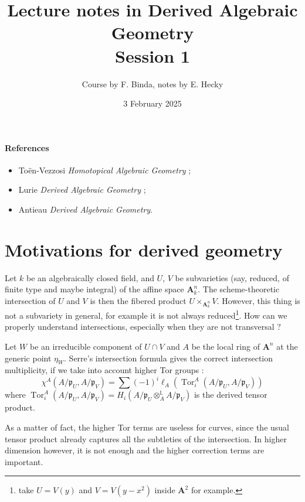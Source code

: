 \documentclass[11pt]{article}
\title{Lecture notes in Derived Algebraic Geometry\\Session 1}
\date{3 February 2025}
\author{Course by F. Binda, notes by E. Hecky}
\theoremstyle{definition}
\newcommand{\A}{\mathbf{A}}
\renewcommand{\L}{\mathbb{L}}
\newcommand{\p}{\mathfrak{p}}
\DeclareMathOperator{\Tor}{Tor}
\begin{document}
\maketitle

\paragraph*{References}
\begin{itemize}
    \item Toën-Vezzosi \emph{Homotopical Algebraic Geometry} ;
    \item Lurie \emph{Derived Algebraic Geometry} ;
    \item Antieau \emph{Derived Algebraic Geometry}.
\end{itemize}

\section*{Motivations for derived geometry}

Let $k$ be an algebraically closed field, and $U$, $V$ be subvarieties (say, reduced, of finite type and maybe integral) of the affine space $\A^n_k$. The scheme-theoretic intersection of $U$ and $V$ is then the fibered product $U \times_{\A^n_k} V$. However, this thing is not a subvariety in general, for example it is not always reduced\footnote{take $U = V(y)$ and $V = V(y - x^2)$ inside $\A^2$ for example.}. How can we properly understand intersections, especially when they are not transversal ?

Let $W$ be an irreducible component of $U \cap V$ and $A$ be the local ring of $\A^n$ at the generic point $\eta_W$. Serre's intersection formula gives the correct intersection multiplicity, if we take into account higher Tor groups :
$$\chi^A(A/\p_U, A/\p_V) = \sum (-1)^i \ell_A(\Tor^A_i(A/\p_U, A/\p_V))$$
where $\Tor^A_i(A/\p_U, A/\p_V) = H_i(A/\p_U \otimes_A^{\L} A/\p_V)$ is the derived tensor product.

As a matter of fact, the higher Tor terms are useless for curves, since the usual tensor product already captures all the subtleties of the intersection. In higher dimension however, it is not enough and the higher correction terms are important.
\end{document}

